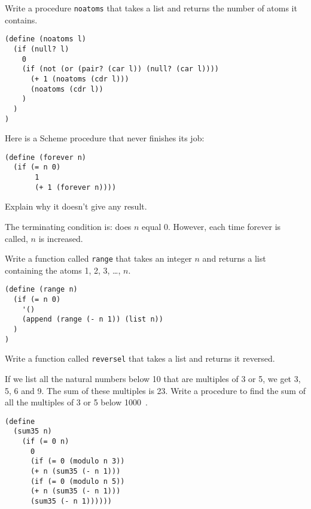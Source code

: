 \begin{questions}
\question
Write a procedure \texttt{noatoms} that takes a list and returns the number of atoms it contains.

\begin{solution}
  \begin{verbatim}
(define (noatoms l)
  (if (null? l)
    0
    (if (not (or (pair? (car l)) (null? (car l))))
      (+ 1 (noatoms (cdr l)))
      (noatoms (cdr l))
    )
  )
)
  \end{verbatim}
\end{solution}

\question
Here is a Scheme procedure that never finishes its job:
\begin{verbatim}
(define (forever n)
  (if (= n 0)
       1
       (+ 1 (forever n))))
\end{verbatim}
Explain why it doesn’t give any result\cite{simplyscheme}.

\begin{solution}
The terminating condition is: does $n$ equal 0.
However, each time forever is called, $n$ is increased.
\end{solution}

\question
Write a function called \texttt{range} that takes an integer $n$ and returns a list containing the atoms 1, 2, 3, \ldots, $n$.

\begin{solution}
\begin{verbatim}
(define (range n)
  (if (= n 0)
    '()
    (append (range (- n 1)) (list n))
  )
)
\end{verbatim}
\end{solution}

\question
Write a function called \texttt{reversel} that takes a list and returns it reversed.  

\question
If we list all the natural numbers below 10 that are multiples of 3 or 5, we get 3, 5, 6 and 9.
The sum of these multiples is 23.
Write a procedure to find the sum of all the multiples of 3 or 5 below 1000~\cite{projecteuler}.

\begin{solution}
  \begin{verbatim}
(define 
  (sum35 n)
    (if (= 0 n)
      0
      (if (= 0 (modulo n 3))
      (+ n (sum35 (- n 1)))
      (if (= 0 (modulo n 5))
      (+ n (sum35 (- n 1)))
      (sum35 (- n 1))))))
  \end{verbatim}
\end{solution}


\end{questions}
